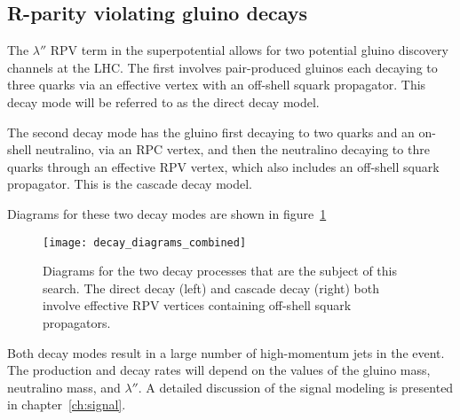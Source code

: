 \subsection{R-parity violating gluino decays}\label{subsec:rpv_gluino}

The $\lambda''$ RPV term in the superpotential allows for two potential gluino discovery channels at the LHC.
The first involves pair-produced gluinos each decaying to three quarks via an effective vertex with an off-shell squark propagator.
This decay mode will be referred to as the direct decay model.

The second decay mode has the gluino first decaying to two quarks and an on-shell neutralino, via an RPC vertex,
and then the neutralino decaying to thre quarks through an effective RPV vertex,
which also includes an off-shell squark propagator.
This is the cascade decay model.

Diagrams for these two decay modes are shown in figure~\ref{fig:susy_rpv_decays}

\begin{figure}[ht!]
    \centering
\texttt{[image: decay\_diagrams\_combined]}
\caption{Diagrams for the two decay processes that are the subject of this search. The direct decay (left) and cascade decay (right)
both involve effective RPV vertices containing off-shell squark propagators.}
\label{fig:susy_rpv_decays}
\end{figure}

Both decay modes result in a large number of high-momentum jets in the event.
The production and decay rates will depend on the values of the gluino mass, neutralino mass, and $\lambda''$.
A detailed discussion of the signal modeling is presented in chapter~\ref{ch:signal}.